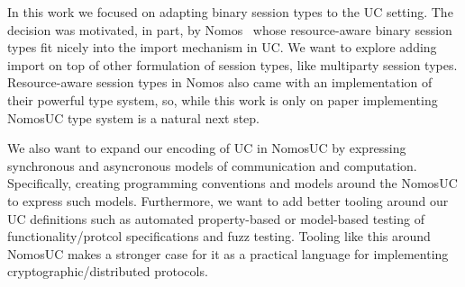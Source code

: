 In this work we focused on adapting binary session types to the UC setting. The decision was motivated, in part, by Nomos~\cite{das2018work, dasnomos} whose resource-aware binary session types
fit nicely into the import mechanism in UC.
We want to explore adding import on top of other formulation of session types, like multiparty session types.
Resource-aware session types in Nomos also came with an implementation of their powerful type system, so, while this work is only on paper implementing NomosUC type system is a natural next step.

We also want to expand our encoding of UC in NomosUC by expressing synchronous and asyncronous models of communication and computation. 
Specifically, creating programming conventions and models around the NomosUC to express such models.
Furthermore, we want to add better tooling around our UC definitions such as automated property-based or model-based testing of functionality/protcol specifications and fuzz testing. 
Tooling like this around NomosUC makes a stronger case for it as a practical language for implementing cryptographic/distributed protocols.
